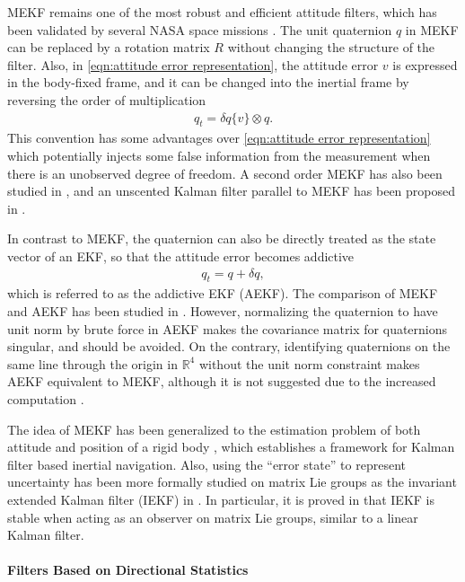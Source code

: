 MEKF remains one of the most robust and efficient attitude filters, which has been validated by several NASA space missions \cite{crassidis2007survey}.
The unit quaternion $q$ in MEKF can be replaced by a rotation matrix $R$ without changing the structure of the filter.
Also, in \eqref{eqn:attitude error representation}, the attitude error $v$ is expressed in the body-fixed frame, and it can be changed into the inertial frame by reversing the order of multiplication
\begin{align}
	q_t = \delta q\{v\} \otimes q.
\end{align}
This convention has some advantages over \eqref{eqn:attitude error representation} \cite{gai1985star,li2012improving} which potentially injects some false information from the measurement when there is an unobserved degree of freedom.
A second order MEKF has also been studied in \cite{markley2003attitude}, and an unscented Kalman filter parallel to MEKF has been proposed in \cite{crassidis2003unscented}.

In contrast to MEKF, the quaternion can also be directly treated as the state vector of an EKF, so that the attitude error becomes addictive
\begin{align}
	q_t = q + \delta q,
\end{align}
which is referred to as the addictive EKF (AEKF).
The comparison of MEKF and AEKF has been studied in \cite{markley2004attitude,shuster2003constraint1,shuster2003constraint2}.
However, normalizing the quaternion to have unit norm by brute force in AEKF makes the covariance matrix for quaternions singular, and should be avoided.
On the contrary, identifying quaternions on the same line through the origin in $\mathbb{R}^4$ without the unit norm constraint makes AEKF equivalent to MEKF, although it is not suggested due to the increased computation \cite{markley2004attitude}.

The idea of MEKF has been generalized to the estimation problem of both attitude and position of a rigid body \cite{sola2017quaternion}, which establishes a framework for Kalman filter based inertial navigation.
Also, using the ``error state'' to represent uncertainty has been more formally studied on matrix Lie groups as the invariant extended Kalman filter (IEKF) in \cite{barrau2014intrinsic,barrau2016invariant,barrau2018invariant}.
In particular, it is proved in \cite{barrau2016invariant} that IEKF is stable when acting as an observer on matrix Lie groups, similar to a linear Kalman filter.

\paragraph{Filters Based on Directional Statistics}

